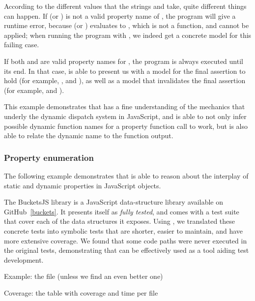 According to the different values that the strings  and  take, quite different things can happen.
If  (or ) is not a valid property name of , the program will give a runtime error, because  (or ) evaluates to , which is not a function, and cannot be applied; when running the program with \cosette, we indeed get a concrete model for this failing case.

If both  and  are valid property names for , the program is always executed until its end.
In that case, \cosette is able to present us with a model for the final assertion to hold (for example, , and ), as well as a model that invalidates the final assertion (for example,  and ).

This example demonstrates that \cosette has a fine understanding of the mechanics that underly the dynamic dispatch system in JavaScript, and is able to not only infer possible dynamic function names for a property function call to work, but is also able to relate the dynamic name to the function output.


\subsubsection{Property enumeration}
The following example demonstrates that \cosette is able to reason about the interplay of static and dynamic properties in JavaScript objects.



The BucketsJS library is a JavaScript data-structure library available on GitHub~\ref{buckets}.
It presents itself as \emph{fully tested}, and comes with a test suite that cover each of the data structures it exposes.
Using \cosette, we translated these concrete tests into symbolic tests that are shorter, easier to maintain, and have more extensive coverage.
We found that some code paths were never executed in the original tests, demonstrating that \cosette can be effectively used as a tool aiding test development.


Example: the  file (unless we find an even better one)


Coverage: the table with coverage and time per file


